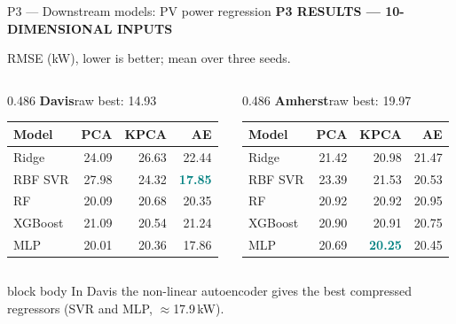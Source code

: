 \documentclass[aspectratio=169,11pt]{beamer}
\newcommand{\sectiontag}[1]{{\footnotesize\usebeamercolor[fg]{structure}\textbf{#1}}\par\vspace{0.10cm}}
\newcommand{\smallmuted}[1]{{\footnotesize\color{slate}#1\par}}
\begin{document}
\begin{frame}{P3 — Downstream models: PV power regression}
\sectiontag{P3 \quad RESULTS — 10-DIMENSIONAL INPUTS}
\smallmuted{RMSE (kW), lower is better; mean over three seeds.}\vspace{0.18cm}
\begin{columns}[T,onlytextwidth]
\begin{column}{0.486\textwidth}
\textbf{Davis}\hfill{\scriptsize raw best: 14.93}\par\vspace{0.12cm}
{\fontsize{8.8}{10.4}\selectfont
\setlength{\tabcolsep}{3.9pt}
\renewcommand{\arraystretch}{1.39}
\begin{tabular}{@{}lrrr@{}}\toprule
\textbf{Model} & \textbf{PCA} & \textbf{KPCA} & \textbf{AE}\\\midrule
Ridge & 24.09 & 26.63 & 22.44\\
RBF SVR & 27.98 & 24.32 & \textcolor{teal}{\textbf{17.85}}\\
RF & 20.09 & 20.68 & 20.35\\
XGBoost & 21.09 & 20.54 & 21.24\\
MLP & 20.01 & 20.36 & 17.86\\
\bottomrule\end{tabular}}
\end{column}
\begin{column}{0.486\textwidth}
\textbf{Amherst}\hfill{\scriptsize raw best: 19.97}\par\vspace{0.12cm}
{\fontsize{8.8}{10.4}\selectfont
\setlength{\tabcolsep}{3.9pt}
\renewcommand{\arraystretch}{1.39}
\begin{tabular}{@{}lrrr@{}}\toprule
\textbf{Model} & \textbf{PCA} & \textbf{KPCA} & \textbf{AE}\\\midrule
Ridge & 21.42 & 20.98 & 21.47\\
RBF SVR & 23.39 & 21.53 & 20.53\\
RF & 20.92 & 20.92 & 20.95\\
XGBoost & 20.90 & 20.91 & 20.75\\
MLP & 20.69 & \textcolor{teal}{\textbf{20.25}} & 20.45\\
\bottomrule\end{tabular}}
\end{column}
\end{columns}
\vspace{0.30cm}
\begin{beamercolorbox}[wd=\linewidth,sep=0.14cm]{block body}
\footnotesize In Davis the non-linear autoencoder gives the best compressed regressors (SVR and MLP, $\approx$17.9\,kW).
\end{beamercolorbox}
\end{frame}
\end{document}
